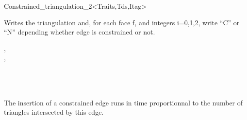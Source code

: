 \begin{ccRefClass}{Constrained_triangulation_2<Traits,Tds,Itag>}

{Writes the triangulation and, for each face f, and integers i=0,1,2,
write ``C'' or ``N'' depending whether edge 
 is constrained or not.}

\ccSeeAlso
{}, \\
, \\
 \\
 \\
 \\





 The insertion of a constrained edge runs in time
proportionnal to the number of triangles intersected by this edge.


\end{ccRefClass}


